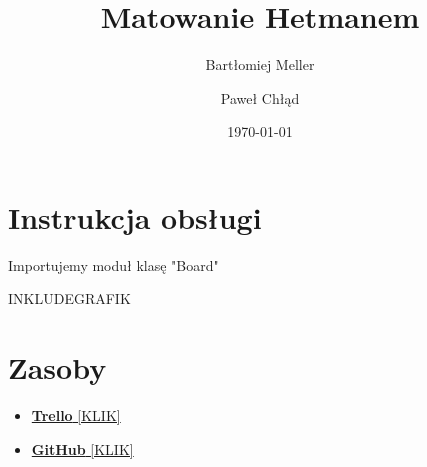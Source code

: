\documentclass{article}
\title{Matowanie Hetmanem}
\author{Bartłomiej Meller\and Paweł Chłąd}
\date{\today}
\begin{document}
\maketitle
\section{Instrukcja obsługi}

Importujemy moduł klasę "Board"

INKLUDEGRAFIK


\section{Zasoby}

\begin{itemize}
\item \href{https://trello.com/invite/b/Kecr8XO8/1945d2bb0b8070f169f0d4e708994033/game-of-life}{\textbf{Trello} [KLIK]}

\item \href{https://github.com/MellerB/IO-game-of-life}{\textbf{GitHub} [KLIK]}


\end{itemize}
\end{document}
